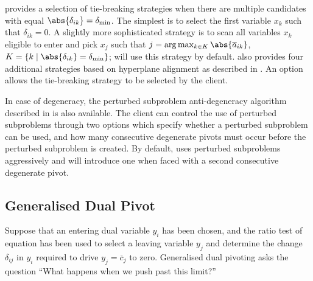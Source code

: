 \dylp provides a selection of tie-breaking strategies when there are multiple
candidates with equal $\abs{\delta_{ik}} = \delta_{\mathrm{min}}$.
The simplest is to select the first variable $x_k$ such that $\delta_{ik} = 0$.
A slightly more sophisticated strategy is to scan all variables $x_k$
eligible to enter and pick $x_j$ such that
$j = \arg \max_{k \in K} \abs{\overline{a}_{ik}}$,
$K = \{ k \mid \abs{\delta_{ik}} =  \delta_{\mathrm{min}} \}$;
\dylp will use this strategy by default.
\dylp also provides four additional strategies based on hyperplane alignment
as described in .
An option allows the tie-breaking strategy to be selected by the client.

In case of degeneracy, the perturbed subproblem anti-degeneracy algorithm
described in  is also available.
The client can control the use of perturbed subproblems through two options
which specify whether a perturbed subproblem can be used, and how many
consecutive degenerate pivots must occur before the perturbed subproblem
is created.
By default, \dylp uses perturbed subproblems aggressively and will
introduce one when faced with a second consecutive degenerate pivot.

\subsection{Generalised Dual Pivot}
\label{sec:DualGenSelectInVar}

Suppose that an entering dual variable $y_i$ has been chosen, and the ratio
test of equation
 has been used to select a leaving variable
$y_j$ and determine the change $\delta_{ij}$ in $y_i$ required to drive
$y_j = \overline{c}_j$ to zero.
Generalised dual pivoting asks the question ``What happens when we push
past this limit?''


